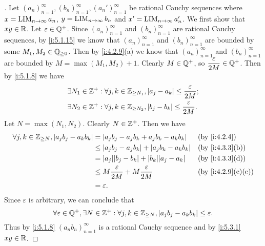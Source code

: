 \begin{proof}[]
  Let \((a_n)_{n = 1}^\infty, (b_n)_{n = 1}^\infty, (a_n')_{n = 1}^\infty\) be rational Cauchy sequences where \(x = \operatorname*{LIM}_{n \to \infty} a_n\), \(y = \operatorname*{LIM}_{n \to \infty} b_n\) and \(x' = \operatorname*{LIM}_{n \to \infty} a_n'\).
  We first show that \(xy \in \mathbb{R}\).
  Let \(\varepsilon \in \mathbb{Q}^+\).
  Since \((a_n)_{n = 1}^\infty\) and \((b_n)_{n = 1}^\infty\) are rational Cauchy sequences, by \cref{i:5.1.15} we know that \((a_n)_{n = 1}^\infty\) and \((b_n)_{n = 1}^\infty\) are bounded by some \(M_1, M_2 \in \mathbb{Q}_{\geq 0}\).
  Then by \cref{i:4.2.9}(a) we know that \((a_n)_{n = 1}^\infty\) and \((b_n)_{n = 1}^\infty\) are bounded by \(M = \max(M_1, M_2) + 1\).
  Clearly \(M \in \mathbb{Q}^+\), so \(\dfrac{\varepsilon}{2M} \in \mathbb{Q}^+\).
  Then by \cref{i:5.1.8} we have
  \begin{align*}
     & \exists N_1 \in \mathbb{Z}^+ : \forall j, k \in \mathbb{Z}_{\geq N_1}, \left\lvert a_j - a_k\right\rvert \leq \dfrac{\varepsilon}{2M}; \\
     & \exists N_2 \in \mathbb{Z}^+ : \forall j, k \in \mathbb{Z}_{\geq N_2}, \left\lvert b_j - b_k\right\rvert \leq \dfrac{\varepsilon}{2M}.
  \end{align*}
  Let \(N = \max(N_1, N_2)\).
  Clearly \(N \in \mathbb{Z}^+\).
  Then we have
  \begin{align*}
    \forall j, k \in \Z_{\geq N}, \abs{a_j b_j - a_k b_k} & = \abs{a_j b_j - a_j b_k + a_j b_k - a_k b_k}              &  & \by{i:4.2.4}      \\
                                                          & \leq \abs{a_j b_j - a_j b_k} + \abs{a_j b_k - a_k b_k}     &  & \by{i:4.3.3}[b]   \\
                                                          & = \abs{a_j} \abs{b_j - b_k} + \abs{b_k} \abs{a_j - a_k}    &  & \by{i:4.3.3}[d]   \\
                                                          & \leq M \dfrac{\varepsilon}{2M} + M \dfrac{\varepsilon}{2M} &  & \by{i:4.2.9}[c,e] \\
                                                          & = \varepsilon.
  \end{align*}
  Since \(\varepsilon\) is arbitrary, we can conclude that
  \[
    \forall \varepsilon \in \mathbb{Q}^+, \exists N \in \mathbb{Z}^+ : \forall j, k \in \mathbb{Z}_{\geq N}, \left\lvert a_j b_j - a_k b_k\right\rvert \leq \varepsilon.
  \]
  Thus by \cref{i:5.1.8} \((a_n b_n)_{n = 1}^\infty\) is a rational Cauchy sequence and by \cref{i:5.3.1} \(xy \in \mathbb{R}\).


\end{proof}
